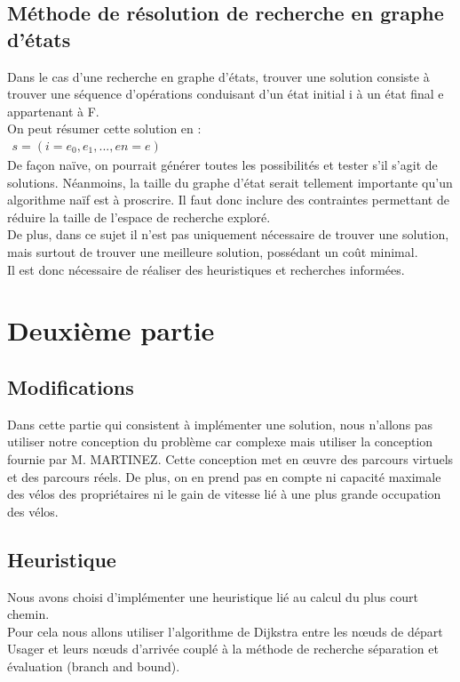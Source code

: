 \documentclass[french]{article}
\begin{document}
\subsection{Méthode de résolution de recherche en graphe d’états}
\noindent
Dans le cas d’une recherche en graphe d’états, trouver une solution consiste à trouver une séquence d’opérations conduisant d’un état initial i à un état final e appartenant à F.\\
On peut résumer cette solution en :\\
$\displaystyle\begin{matrix}
s =(i=e_{0},e_{1}, ... ,e{n}=e)
\end{matrix}$\\
De façon naïve, on pourrait générer toutes les possibilités et tester s’il s’agit de solutions. Néanmoins, la taille du graphe d’état serait tellement importante qu’un algorithme naïf est à proscrire. Il faut donc inclure des contraintes permettant de réduire la taille de l’espace de recherche exploré.\\
De plus, dans ce sujet il n’est pas uniquement nécessaire de trouver une solution, mais surtout de trouver une meilleure solution, possédant un coût minimal.\\
Il est donc nécessaire de réaliser des heuristiques et recherches informées.\\

\section{Deuxième partie}
\subsection{Modifications}
Dans cette partie qui consistent à implémenter une solution, nous n'allons pas utiliser notre conception du problème car complexe mais utiliser la conception fournie par M. MARTINEZ. Cette conception met en œuvre des parcours virtuels et des parcours réels. De plus, on en prend pas en compte ni capacité maximale des vélos des propriétaires ni le gain de vitesse lié à une plus grande occupation des vélos.

\subsection{Heuristique}
Nous avons choisi d'implémenter une heuristique lié au calcul du plus court chemin. \\
Pour cela nous allons utiliser l'algorithme de Dijkstra entre les nœuds de départ Usager et leurs nœuds d'arrivée couplé à la méthode de recherche séparation et évaluation (branch and bound).
\end{document}
